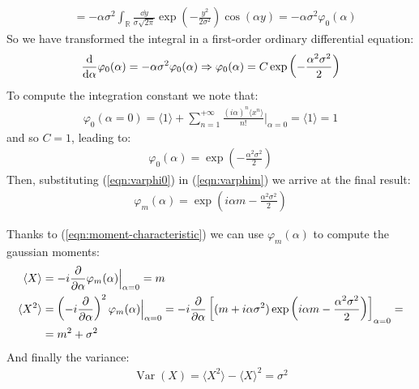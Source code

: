 \documentclass[../../main.tex]{subfiles}
\begin{document}
\begin{example}
\begin{align*}
        &= -\alpha\sigma^2 \int_{\mathbb{R}} \frac{\dd{y}}{\sigma \sqrt{2 \pi}}\exp\left(-\frac{y^2}{2 \sigma^2} \right) \cos(\alpha y) = -\alpha\sigma^2 \varphi_0(\alpha)
    \end{align*}
    So we have transformed the integral in a first-order ordinary differential equation:
    \begin{align*}
        \dv{\alpha} \varphi_0(\alpha) = - \alpha \sigma^2 \varphi_0(\alpha) \Rightarrow \varphi_0(\alpha) = C \exp\left(-\frac{\alpha^2 \sigma^2}{2} \right)
    \end{align*}
    To compute the integration constant we note that:
    \begin{align*}
        \varphi_0(\alpha = 0) = \langle 1 \rangle + \sum_{n=1}^{+\infty} \frac{(i \alpha)^n \langle x^n \rangle}{n!} \Big|_{\alpha = 0} = \langle 1 \rangle = 1
    \end{align*}
    and so $C=1$, leading to:
    \begin{align}\label{eqn:varphi0}
        \varphi_0(\alpha) = \exp\left(-\frac{\alpha^2 \sigma^2}{2} \right)
    \end{align}
    Then, substituting (\ref{eqn:varphi0}) in (\ref{eqn:varphim}) we arrive at the final result:
    \begin{align*}
        \varphi_m(\alpha) = \exp(i \alpha m - \frac{\alpha^2 \sigma^2}{2} )
    \end{align*}

    Thanks to (\ref{eqn:moment-characteristic}) we can use $\varphi_m(\alpha)$ to compute the gaussian moments:
    \begin{align*}
        \langle X \rangle &= -i \pdv{\alpha} \varphi_{m}(\alpha) \Big|_{\alpha = 0} = m\\
        \langle X^2 \rangle &= \left(-i \pdv{\alpha}\right)^2 \varphi_m(\alpha) \Big|_{\alpha=0} = -i\pdv{\alpha} \left[(m + i \alpha \sigma^2) \exp\left(i \alpha m - \frac{\alpha^2 \sigma^2}{2} \right)\right]_{\alpha = 0}=\\
        &= m^2 + \sigma^2
    \end{align*}
    And finally the variance:
    \begin{align*}
        \operatorname{Var}(X) = \langle X^2 \rangle - \langle X \rangle^2 = \sigma^2
    \end{align*}
\end{example}
\end{document}
